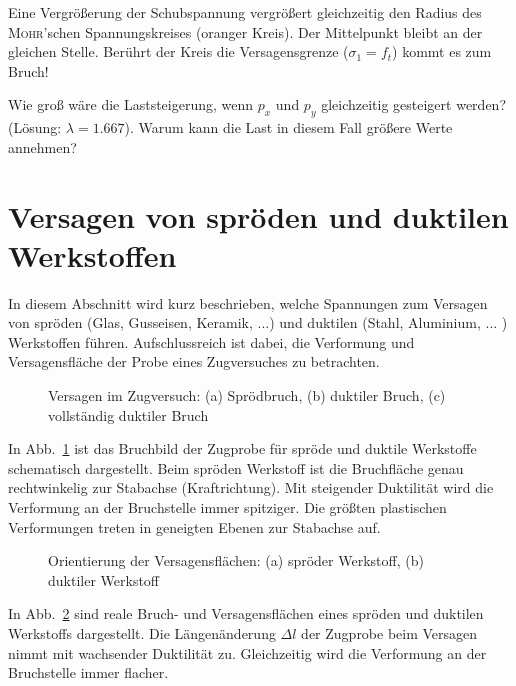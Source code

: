 \begin{example}
	Eine Vergrößerung der Schubspannung vergrößert gleichzeitig den Radius des \textsc{Mohr}'schen Spannungskreises (oranger Kreis).
	Der Mittelpunkt bleibt an der gleichen Stelle.
	Berührt der Kreis die Versagensgrenze ($\sigma_1=f_t$) kommt es zum Bruch!
	\begin{center}
		
	\end{center}
	
	Wie groß wäre die Laststeigerung, wenn $p_x$ und $p_y$ gleichzeitig gesteigert werden?
	(Lösung: $\lambda=1.667$).
	Warum kann die Last in diesem Fall größere Werte annehmen?
\end{example}



\section{Versagen von spröden und duktilen Werkstoffen}

In diesem Abschnitt wird kurz beschrieben, welche Spannungen zum Versagen von spröden (Glas, Gusseisen, Keramik, ...) und duktilen (Stahl, Aluminium, ... ) Werkstoffen führen.
Aufschlussreich ist dabei, die Verformung und Versagensfläche der Probe eines Zugversuches zu betrachten.  
%
\begin{figure}[h!]
	\centering
	
	\caption{Versagen im Zugversuch: (a) Sprödbruch, (b) duktiler Bruch, (c) vollständig duktiler Bruch}
	\label{fig:5-10}
\end{figure}
%
In Abb.~\ref{fig:5-10} ist das Bruchbild der Zugprobe für spröde und duktile Werkstoffe schematisch dargestellt.
Beim  spröden Werkstoff ist die Bruchfläche genau rechtwinkelig zur Stabachse (Kraftrichtung).
Mit steigender Duktilität wird die Verformung an der Bruchstelle immer spitziger.
Die größten plastischen Verformungen treten in geneigten Ebenen zur Stabachse auf.
%
\begin{figure}[h!]
	\centering
	
	\caption{Orientierung der Versagensflächen: (a) spröder Werkstoff, (b) duktiler Werkstoff}
	\label{fig:5-11}
\end{figure}
%
In Abb.~\ref{fig:5-11} sind reale Bruch- und Versagensflächen eines spröden und duktilen Werkstoffs dargestellt.
Die Längenänderung $\Delta l$ der Zugprobe beim Versagen nimmt mit wachsender Duktilität zu.
Gleichzeitig wird die Verformung an der Bruchstelle immer flacher. 

